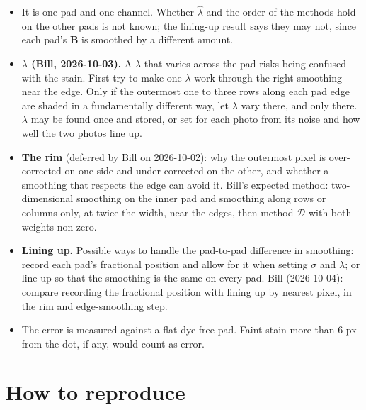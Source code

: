 \documentclass[11pt,letterpaper]{article}
\newcommand{\mB}{\mathbf{B}}   %
\newcommand{\MD}{\mathcal{D}}
\begin{document}
\begin{itemize}
  \item It is one pad and one channel.  Whether $\hat\lambda$ and the order
    of the methods hold on the other pads is not known; the lining-up
    result says they may not, since each pad's $\mB$ is smoothed by a
    different amount.
  \item \textbf{$\lambda$ (Bill, 2026-10-03).}  A $\lambda$ that varies across
    the pad risks being confused with the stain.  First try to make one
    $\lambda$ work through the right smoothing near the edge.  Only if the
    outermost one to three rows along each pad edge are shaded in a
    fundamentally different way, let $\lambda$ vary there, and only there.
    $\lambda$ may be found once and stored, or set for each photo from its
    noise and how well the two photos line up.
  \item \textbf{The rim} (deferred by Bill on 2026-10-02): why the outermost
    pixel is over-corrected on one side and under-corrected on the other,
    and whether a smoothing that respects the edge can avoid it.  Bill's
    expected method: two-dimensional smoothing on the inner pad and
    smoothing along rows or columns only, at twice the width, near the
    edges, then method $\MD$ with both weights non-zero.
  \item \textbf{Lining up.}  Possible ways to handle the pad-to-pad
    difference in smoothing: record each pad's fractional position and
    allow for it when setting $\sigma$ and $\lambda$; or line up so that the
    smoothing is the same on every pad.  Bill (2026-10-04): compare
    recording the fractional position with lining up by nearest pixel, in
    the rim and edge-smoothing step.
  \item The error is measured against a flat dye-free pad.  Faint stain
    more than 6 px from the dot, if any, would count as error.
\end{itemize}

\section{How to reproduce}
\end{document}
